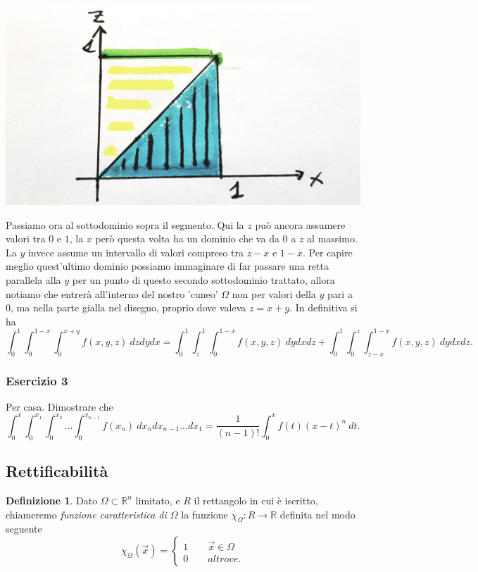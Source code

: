 \documentclass[10pt]{article}
\theoremstyle{plain}
\theoremstyle{definition}
\newtheorem{defn}{Definizione}
\begin{document}
\begin{minipage}{.50\textwidth}
\centering
\includegraphics[width=1\textwidth]{fig10.jpg}
\end{minipage} 
Passiamo ora al sottodominio sopra il segmento. Qui la $z$ può ancora assumere valori tra $0$ e $1$, la $x$ però questa volta ha un dominio che va da $0$ a $z$ al massimo. La $y$ invece assume un intervallo di valori compreso tra $z-x$ e $1-x$. Per capire meglio quest'ultimo dominio possiamo immaginare di far passare una retta parallela alla $y$ per un punto di questo secondo sottodominio trattato, allora notiamo che entrerà all'interno  del nostro 'cuneo' $\Omega$ non per valori della $y$ pari a 0, ma nella parte gialla nel disegno, proprio dove valeva $z=x+y$.
In definitiva si ha
\begin{equation*}
\int_0^1 \int_0^{1-x} \int_0^{x+y} f(x,y,z)\ dz dy dx=
\int_0^1 \int_z^{1} \int_0^{1-x} f(x,y,z)\ dy dx dz+
\int_0^1 \int_0^{z} \int_{z-x}^{1-x} f(x,y,z)\ dy dx dz.
\label{eq:int_ordine}
\end{equation*}

\subsubsection{Esercizio 3}
Per casa. Dimostrare che
\begin{equation*}
    \int_0^x \int_0^{x_1} \int_0^{x_2}...\int_0^{x_{n-1}}f(x_n)\ dx_n dx_{n-1} ... dx_1 =
    \frac{1}{(n-1)!}\int_0^xf(t)(x-t)^n\ dt.
\end{equation*}

\subsection{Rettificabilità}
\begin{defn}
Dato $\Omega \subset \mathbb{R} ^n$ limitato, e $R$ il rettangolo in cui è iscritto, chiameremo \textit{funzione caratteristica di $\Omega$} la funzione $\chi_\Omega: R\to \mathbb{R}$ definita nel modo seguente
\begin{equation*}
  \chi_\Omega(\vec{x})=
   \begin{cases}
   1\qquad \vec{x}\in \Omega\\
   0 \qquad altrove.
   \end{cases}
\end{equation*}
\end{defn}
\end{document}
